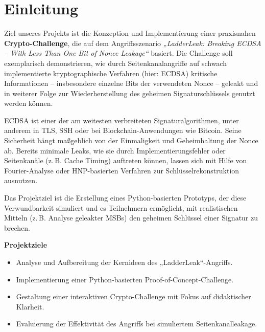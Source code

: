 \documentclass{article}
\begin{document}
\newpage
\lstlistoflistings
{}


\newpage

\cleardoublepage


\section{Einleitung}

Ziel unseres Projekts ist die Konzeption und Implementierung einer praxisnahen \textbf{Crypto-Challenge}, die auf dem Angriffsszenario \emph{„LadderLeak: Breaking ECDSA – With Less Than One Bit of Nonce Leakage“} basiert. Die Challenge soll exemplarisch demonstrieren, wie durch Seitenkanalangriffe auf schwach implementierte kryptographische Verfahren (hier: ECDSA) kritische Informationen – insbesondere einzelne Bits der verwendeten Nonce – geleakt und in weiterer Folge zur Wiederherstellung des geheimen Signaturschlüssels genutzt werden können.

ECDSA ist einer der am weitesten verbreiteten Signaturalgorithmen, unter anderem in TLS, SSH oder bei Blockchain-Anwendungen wie Bitcoin. Seine Sicherheit hängt maßgeblich von der Einmaligkeit und Geheimhaltung der Nonce ab. Bereits minimale Leaks, wie sie durch Implementierungsfehler oder Seitenkanäle (z.\,B. Cache Timing) auftreten können, lassen sich mit Hilfe von Fourier-Analyse oder HNP-basierten Verfahren zur Schlüsselrekonstruktion ausnutzen.

Das Projektziel ist die Erstellung eines Python-basierten Prototyps, der diese Verwundbarkeit simuliert und es Teilnehmern ermöglicht, mit realistischen Mitteln (z.\,B. Analyse geleakter MSBs) den geheimen Schlüssel einer Signatur zu brechen.

\textbf{Projektziele}
\begin{itemize}
    \item Analyse und Aufbereitung der Kernideen des „LadderLeak“-Angriffs.
    \item Implementierung einer Python-basierten Proof-of-Concept-Challenge.
    \item Gestaltung einer interaktiven Crypto-Challenge mit Fokus auf didaktischer Klarheit.
    \item Evaluierung der Effektivität des Angriffs bei simuliertem Seitenkanalleakage.
\end{itemize}
\end{document}
